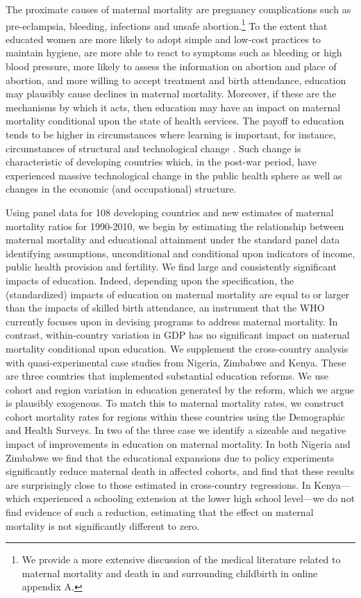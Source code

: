 \documentclass{article}[12pt,subeqn]
\begin{document}
\begin{spacing}{1.4}
The proximate causes of maternal mortality are pregnancy complications such as 
pre-eclampsia, bleeding, infections and unsafe abortion.\footnote{We provide a
more extensive discussion of the medical literature related to maternal mortality
and death in and surrounding childbirth in online appendix A.} To 
the extent that educated women are more likely to adopt simple and low-cost 
practices to maintain hygiene, are more able to react to symptoms such as bleeding 
or high blood pressure, more likely to assess the information on abortion and place 
of abortion, and more willing to accept
treatment and birth attendance, education may plausibly cause declines in maternal 
mortality. Moreover, if these are the mechanisms by which it acts, then education 
may have an impact on maternal mortality conditional upon the state of health 
services. The payoff to education tends to be higher in circumstances where 
learning is important, for instance, circumstances of structural and technological 
change \citep{FosterRosenzweig2004}. Such change is characteristic of developing 
countries which, in the post-war period, have experienced massive technological 
change in the public health sphere \citep{Cutleretal2006} as well as changes in 
the economic (and occupational) structure.

Using panel data for 108 developing countries and new estimates of maternal 
mortality ratios for 1990-2010, we begin by estimating the relationship between
maternal mortality and educational attainment under the standard panel data
identifying assumptions, unconditional and conditional upon indicators of income,
public health provision and fertility. We find large and consistently significant
impacts of education. Indeed, depending upon the specification, the (standardized)
impacts of education on maternal mortality are equal to or larger than the impacts
of skilled birth attendance, an instrument that the WHO currently focuses upon in 
devising programs to address maternal mortality. In contrast, within-country 
variation in GDP has no significant impact on maternal mortality conditional upon 
education. We supplement the cross-country analysis with quasi-experimental case 
studies from Nigeria, Zimbabwe and Kenya. These are three countries that 
implemented substantial education reforms. We use cohort and region variation in 
education generated by the reform, which we argue is plausibly exogenous. To match 
this to maternal mortality rates, we construct cohort mortality rates for regions 
within these countries using the Demographic and Health Surveys. In two of the 
three case we identify a sizeable and negative impact of improvements in education 
on maternal mortality. In both Nigeria and Zimbabwe we find that the educational 
expansions due to policy experiments significantly reduce maternal death in
affected cohorts, and find that these results are surprisingly close to those 
estimated in cross-country regressions.  In Kenya---which experienced a schooling 
extension at the lower high school level---we do not find evidence of such a 
reduction, estimating that the effect on maternal mortality is not significantly 
different to zero.


\end{spacing}
\end{document}
